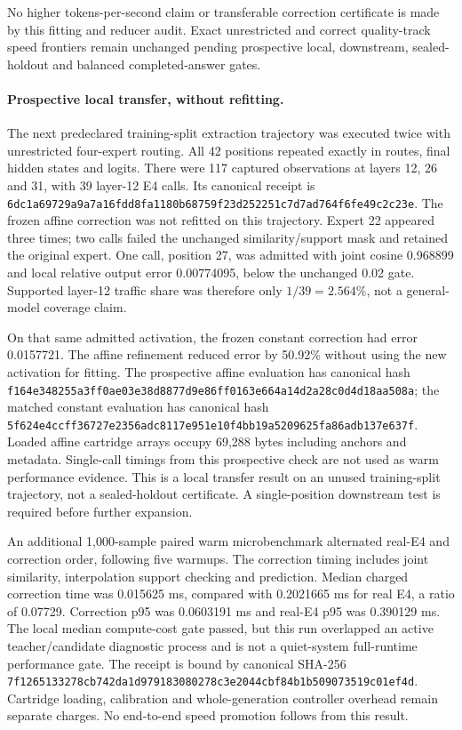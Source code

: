 No higher tokens-per-second claim or transferable correction certificate is
made by this fitting and reducer audit.  Exact unrestricted and correct
quality-track speed frontiers remain unchanged pending prospective local,
downstream, sealed-holdout and balanced completed-answer gates.

\paragraph{Prospective local transfer, without refitting.}
The next predeclared training-split extraction trajectory was executed twice
with unrestricted four-expert routing.  All 42 positions repeated exactly in
routes, final hidden states and logits.  There were 117 captured observations
at layers 12, 26 and 31, with 39 layer-12 E4 calls.  Its canonical receipt is
\texttt{6dc1a69729a9a7a16fdd8fa1180b68759f23d252251c7d7ad764f6fe49c2c23e}.
The frozen affine correction was not refitted on this trajectory.  Expert 22
appeared three times; two calls failed the unchanged similarity/support mask
and retained the original expert.  One call, position 27, was admitted with
joint cosine 0.968899 and local relative output error 0.00774095, below the
unchanged 0.02 gate.  Supported layer-12 traffic share was therefore only
\(1/39=2.564\%\), not a general-model coverage claim.

On that same admitted activation, the frozen constant correction had error
0.0157721.  The affine refinement reduced error by 50.92\% without using the new
activation for fitting.  The prospective affine evaluation has canonical hash
\texttt{f164e348255a3ff0ae03e38d8877d9e86ff0163e664a14d2a28c0d4d18aa508a};
the matched constant evaluation has canonical hash
\texttt{5f624e4ccff36727e2356adc8117e951e10f4bb19a5209625fa86adb137e637f}.
Loaded affine cartridge arrays occupy 69,288 bytes including anchors and
metadata.  Single-call timings from this prospective check are not used as
warm performance evidence.  This is a local transfer result on an unused
training-split trajectory, not a sealed-holdout certificate.  A single-position
downstream test is required before further expansion.

An additional 1,000-sample paired warm microbenchmark alternated real-E4 and
correction order, following five warmups.  The correction timing includes joint
similarity, interpolation support checking and prediction.  Median charged
correction time was 0.015625 ms, compared with 0.2021665 ms for real E4, a ratio
of 0.07729.  Correction p95 was 0.0603191 ms and real-E4 p95 was 0.390129 ms.
The local median compute-cost gate passed, but this run overlapped an active
teacher/candidate diagnostic process and is not a quiet-system full-runtime
performance gate.  The receipt is bound by canonical SHA-256
\texttt{7f1265133278cb742da1d979183080278c3e2044cbf84b1b509073519c01ef4d}.
Cartridge loading, calibration and whole-generation controller overhead remain
separate charges.  No end-to-end speed promotion follows from this result.


